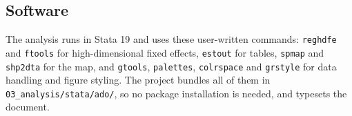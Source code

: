 \subsection{Software}

The analysis runs in Stata 19 and uses these user-written commands:
\texttt{reghdfe} and \texttt{ftools} for high-dimensional fixed effects,
\texttt{estout} for tables, \texttt{spmap} and \texttt{shp2dta} for the map,
and \texttt{gtools}, \texttt{palettes}, \texttt{colrspace} and
\texttt{grstyle} for data handling and figure styling. The project bundles
all of them in \texttt{03\_analysis/stata/ado/}, so no package installation
is needed, and \XeLaTeX{} typesets the document.
